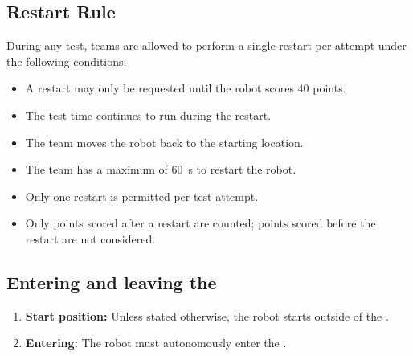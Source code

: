 \subsection{Restart Rule}\label{rule:restart}

During any test, teams are allowed to perform a single restart per attempt under the following conditions:
\begin{itemize}
    \item A restart may only be requested until the robot scores 40 points.
    \item The test time continues to run during the restart.
    \item The team moves the robot back to the starting location.
    \item The team has a maximum of \SI{60}{\second} to restart the robot.
    \item Only one restart is permitted per test attempt.
    \item Only points scored after a restart are counted; points scored before the restart are not considered.
\end{itemize}


\subsection{Entering and leaving the \Arena{}}\label{rule:start_position}
\begin{enumerate}

	\item \textbf{Start position:} Unless stated otherwise, the robot starts outside of the \Arena{}.
	\item \textbf{Entering:} The robot must autonomously enter the \Arena{}.
\end{enumerate}



